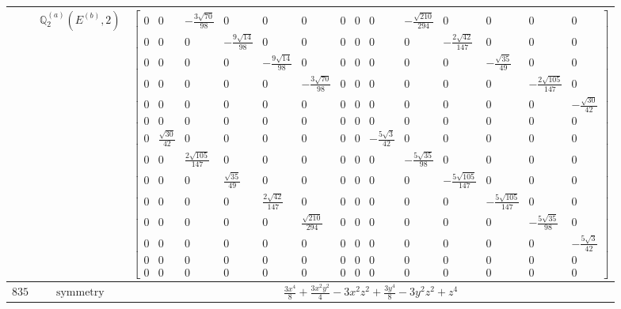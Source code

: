 \documentclass[fleqn,8pt,landscape]{jsarticle}
\begin{document}
\begin{longtable}{ccc}
$  $ & $ \mathbb{Q}_{2}^{(a)}(E^{(b)},2) $ & $ \begin{bmatrix} 0 & 0 & - \frac{3 \sqrt{70}}{98} & 0 & 0 & 0 & 0 & 0 & 0 & - \frac{\sqrt{210}}{294} & 0 & 0 & 0 & 0 \\ 0 & 0 & 0 & - \frac{9 \sqrt{14}}{98} & 0 & 0 & 0 & 0 & 0 & 0 & - \frac{2 \sqrt{42}}{147} & 0 & 0 & 0 \\ 0 & 0 & 0 & 0 & - \frac{9 \sqrt{14}}{98} & 0 & 0 & 0 & 0 & 0 & 0 & - \frac{\sqrt{35}}{49} & 0 & 0 \\ 0 & 0 & 0 & 0 & 0 & - \frac{3 \sqrt{70}}{98} & 0 & 0 & 0 & 0 & 0 & 0 & - \frac{2 \sqrt{105}}{147} & 0 \\ 0 & 0 & 0 & 0 & 0 & 0 & 0 & 0 & 0 & 0 & 0 & 0 & 0 & - \frac{\sqrt{30}}{42} \\ 0 & 0 & 0 & 0 & 0 & 0 & 0 & 0 & 0 & 0 & 0 & 0 & 0 & 0 \\ 0 & \frac{\sqrt{30}}{42} & 0 & 0 & 0 & 0 & 0 & 0 & - \frac{5 \sqrt{3}}{42} & 0 & 0 & 0 & 0 & 0 \\ 0 & 0 & \frac{2 \sqrt{105}}{147} & 0 & 0 & 0 & 0 & 0 & 0 & - \frac{5 \sqrt{35}}{98} & 0 & 0 & 0 & 0 \\ 0 & 0 & 0 & \frac{\sqrt{35}}{49} & 0 & 0 & 0 & 0 & 0 & 0 & - \frac{5 \sqrt{105}}{147} & 0 & 0 & 0 \\ 0 & 0 & 0 & 0 & \frac{2 \sqrt{42}}{147} & 0 & 0 & 0 & 0 & 0 & 0 & - \frac{5 \sqrt{105}}{147} & 0 & 0 \\ 0 & 0 & 0 & 0 & 0 & \frac{\sqrt{210}}{294} & 0 & 0 & 0 & 0 & 0 & 0 & - \frac{5 \sqrt{35}}{98} & 0 \\ 0 & 0 & 0 & 0 & 0 & 0 & 0 & 0 & 0 & 0 & 0 & 0 & 0 & - \frac{5 \sqrt{3}}{42} \\ 0 & 0 & 0 & 0 & 0 & 0 & 0 & 0 & 0 & 0 & 0 & 0 & 0 & 0 \\ 0 & 0 & 0 & 0 & 0 & 0 & 0 & 0 & 0 & 0 & 0 & 0 & 0 & 0 \end{bmatrix} $ \\ \hline
$ 835 $ & $ \text{symmetry} $ & $ \frac{3 x^{4}}{8} + \frac{3 x^{2} y^{2}}{4} - 3 x^{2} z^{2} + \frac{3 y^{4}}{8} - 3 y^{2} z^{2} + z^{4} $ \\

\end{longtable}
\end{document}
